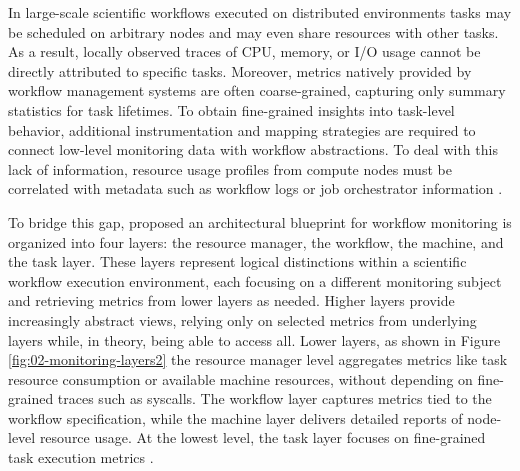 In large-scale scientific workflows executed on distributed environments tasks may be scheduled on arbitrary nodes and may even share resources with other tasks. As a result, locally observed traces of CPU, memory, or I/O usage cannot be directly attributed to specific tasks.  Moreover, metrics natively provided by workflow management systems are often coarse-grained, capturing only summary statistics for task lifetimes. To obtain fine-grained insights into task-level behavior, additional instrumentation and mapping strategies are required to connect low-level monitoring data with workflow abstractions. To deal with this lack of information, resource usage profiles from compute nodes must be correlated with metadata such as workflow logs or job orchestrator information \cite{Witzke2024}.

To bridge this gap, \cite{Bader_2022} proposed an architectural blueprint for workflow monitoring is organized into four layers: the resource manager, the workflow, the machine, and the task layer. These layers represent logical distinctions within a scientific workflow execution environment, each focusing on a different monitoring subject and retrieving metrics from lower layers as needed. Higher layers provide increasingly abstract views, relying only on selected metrics from underlying layers while, in theory, being able to access all. Lower layers, as shown in Figure \ref{fig:02-monitoring-layers2} the resource manager level aggregates metrics like task resource consumption or available machine resources, without depending on fine-grained traces such as syscalls. The workflow layer captures metrics tied to the workflow specification, while the machine layer delivers detailed reports of node-level resource usage. At the lowest level, the task layer focuses on fine-grained task execution metrics \cite{Bader_2022}.


